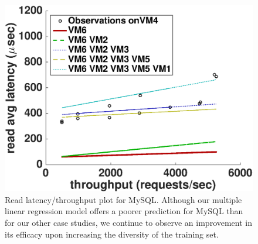   \begin{figure}
    \centering
    \includegraphics[scale = 0.4]{mysql_fit_read_avg_latency.eps}
    \caption{Read latency/throughput plot for MySQL. Although our multiple linear regression model offers a poorer prediction for MySQL than for our other case studies, we continue to observe an improvement in its efficacy upon increasing the diversity of the training set. }
    \label{figure:mysql}
  \end{figure}

